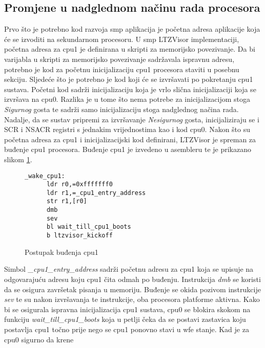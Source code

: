 \documentclass[times, utf8, diplomski, numeric]{fer}
\begin{document}
\subsection{Promjene u nadglednom načinu rada procesora}
Prvo što je potrebno kod razvoja \gls{smp} aplikacija je početna adresa aplikacije koja će se izvoditi na sekundarnom procesoru.
U \gls{smp} LTZVisor implementaciji, početna adresa za \gls{cpu}1 je definirana u skripti za memorijsko povezivanje. Da bi varijabla u
skripti za memorijsko povezivanje sadržavala ispravnu adresu, potrebno je kod za početnu inicijalizaciju \gls{cpu}1 procesora staviti
u posebnu sekciju. Sljedeće što je potrebno je kod koji će se izvršavati po pokretanju \gls{cpu}1 sustava. Početni kod sadrži
inicijalizaciju koja je vrlo slična inicijalizaciji koja se izvršava na \gls{cpu}0. Razlika je u tome što nema potrebe za
inicijalizacijom stoga \textit{Sigurnog} gosta te sadrži samo inicijalizaciju stoga nadglednog načina rada. Nadalje, da se
sustav pripremi za izvršavanje \textit{Nesigurnog} gosta, inicijaliziraju se i SCR i NSACR registri s jednakim vrijednostima
kao i kod \gls{cpu}0. Nakon što su početna adresa za \gls{cpu}1 i inicijalizacijski kod definirani, LTZVisor je spreman za buđenje \gls{cpu}1
procesora. Buđenje \gls{cpu}1 je izvedeno u asembleru te je prikazano slikom \ref{wake_cpu1}.
\begin{figure}[H]
  \centering
  \lstset{numbers=left, numbersep=2pt, numberstyle=\tiny, breaklines=true, xleftmargin=.2\textwidth}
  \begin{lstlisting}[firstnumber=1]
    _wake_cpu1:
      ldr r0,=0xfffffff0
      ldr r1,=_cpu1_entry_address
      str r1,[r0]
      dmb
      sev
      bl wait_till_cpu1_boots
      b ltzvisor_kickoff
  \end{lstlisting}
  \caption{Postupak buđenja \gls{cpu}1}
  \label{wake_cpu1}
\end{figure}
Simbol \textit{\_cpu1\_entry\_address} sadrži početnu adresu za \gls{cpu}1 koja se upisuje na odgovarajuću adresu koju \gls{cpu}1 čita
odmah po buđenju. Instrukcija \textit{dmb} se koristi da se osigura završetak pisanja u memoriju. Buđenje se okida pozivom
instrukcije \textit{sev} te su nakon izvršavanja te instrukcije, oba procesora platforme aktivna. Kako bi se osigurala ispravna
inicijalizacija \gls{cpu}1 sustava, \gls{cpu}0 se blokira skokom na funkciju \textit{wait\_till\_cpu1\_boots} koja u petlji čeka da se
postavi zastavica koju postavlja \gls{cpu}1 točno prije nego se \gls{cpu}1 ponovno stavi u \gls{wfe} stanje. Kad je za \gls{cpu}0 sigurno da krene
\end{document}
